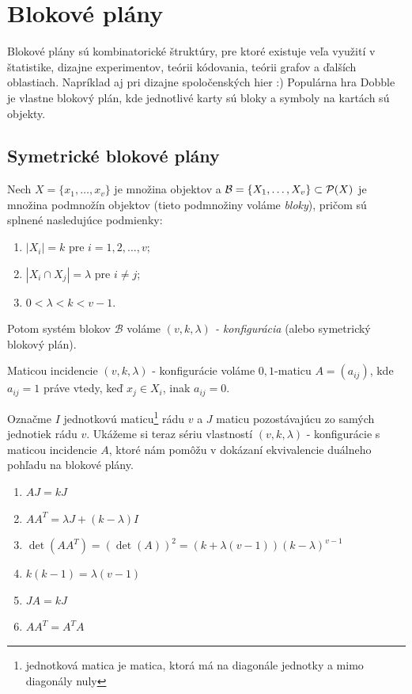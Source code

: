 \chapter{Blokové plány}

Blokové plány sú kombinatorické štruktúry, pre ktoré existuje veľa využití v štatistike, dizajne experimentov, teórii kódovania, teórii grafov a ďalších oblastiach. Napríklad aj pri dizajne spoločenských hier :) Populárna hra Dobble je vlastne blokový plán, kde jednotlivé karty sú bloky a symboly na kartách sú objekty.

\section{Symetrické blokové plány}

\begin{definition}

Nech $X = \{x_1, \ldots, x_v\}$ je množina objektov a $\mathcal{B} = \left\{X_1, \ldots, X_v\right\} \subset \mathcal{P}(X)$ je množina podmnožín objektov (tieto podmnožiny voláme \emph{bloky}), pričom sú splnené nasledujúce podmienky:
\begin{enumerate}
	\item $|X_i| = k$ pre $i = 1, 2, \ldots, v$;
	\item $|X_i \cap X_j| = \lambda$ pre $i \neq j$;
	\item $0 < \lambda < k < v - 1$.
\end{enumerate}
Potom systém blokov $\mathcal{B}$ voláme \emph{$(v, k, \lambda)$ - konfigurácia} (alebo symetrický blokový plán).

\end{definition}


\begin{definition}

Maticou incidencie $(v, k, \lambda)$ - konfigurácie voláme $0,1$-maticu $A = (a_{ij})$, kde $a_{ij} = 1$ práve vtedy, keď $x_j \in X_i$, inak $a_{ij} = 0$.

\end{definition}

\begin{theorem}

Označme $I$ jednotkovú maticu\footnote{jednotková matica je matica, ktorá má na diagonále jednotky a mimo diagonály nuly} rádu $v$ a $J$ maticu pozostávajúcu zo samých jednotiek rádu $v$. Ukážeme si teraz sériu vlastností $(v, k, \lambda)$ - konfigurácie s maticou incidencie $A$, ktoré nám pomôžu v dokázaní ekvivalencie duálneho pohľadu na blokové plány.
\begin{enumerate}
	\item $A J = k J$
	\item $A A^T = \lambda J + (k - \lambda) I$
	\item $\det(A A^T) = (\det(A))^2 = (k + \lambda (v - 1)) (k - \lambda)^{v-1}$
	\item $k (k-1) = \lambda (v-1)$
	\item $J A = k J$
	\item $A A^T = A^T A$
\end{enumerate}
\label{theo:SBIBD_properties}
\end{theorem}

